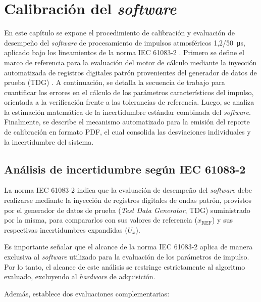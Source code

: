 \newpage
\chapter{Calibración del \emph{software}}
\label{ch:calibracion_software}
\vspace{3\baselineskip}

En este capítulo se expone el procedimiento de calibración y evaluación de desempeño del \emph{software} de procesamiento de impulsos atmosféricos \qty[parse-numbers=false]{1,2/50}{\micro\second}, aplicado bajo los lineamientos de la norma IEC 61083-2 \cite{iec61083_2}. Primero se define el marco de referencia para la evaluación del motor de cálculo mediante la inyección automatizada de registros digitales patrón provenientes del generador de datos de prueba (TDG) \cite{iec61083_2}. A continuación, se detalla la secuencia de trabajo para cuantificar los errores en el cálculo de los parámetros característicos del impulso, orientada a la verificación frente a las tolerancias de referencia. Luego, se analiza la estimación matemática de la incertidumbre estándar combinada del \emph{software}. Finalmente, se describe el mecanismo automatizado para la emisión del reporte de calibración en formato PDF, el cual consolida las desviaciones individuales y la incertidumbre del sistema.


\section{Análisis de incertidumbre según IEC 61083-2}
\label{subsec:analisis_incertidumbre_iec61083_2}
\vspace{3\baselineskip}

La norma IEC 61083-2 \cite{iec61083_2} indica que la evaluación de desempeño del \emph{software} debe realizarse mediante la inyección de registros digitales de ondas patrón, provistos por el generador de datos de prueba (\emph{Test Data Generator}, TDG) suministrado por la misma, para compararlos con sus valores de referencia ($x_{\text{REF}}$) y sus respectivas incertidumbres expandidas ($U_x$).

Es importante señalar que el alcance de la norma IEC 61083-2 aplica de manera exclusiva al \emph{software} utilizado para la evaluación de los parámetros de impulso. Por lo tanto, el alcance de este análisis se restringe estrictamente al algoritmo evaluado, excluyendo al \emph{hardware} de adquisición.

Además, establece dos evaluaciones complementarias:


